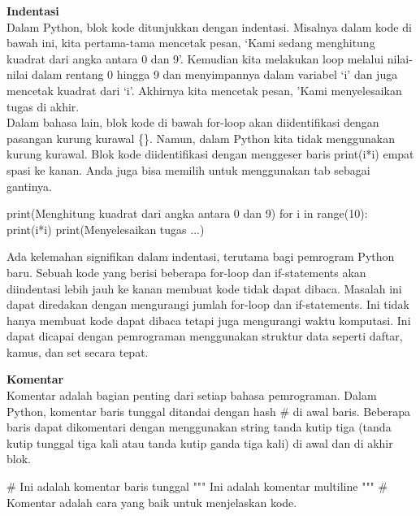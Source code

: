 \documentclass[
  letterpaper,
  DIV=11,
  numbers=noendperiod]{scrreprt}
\newenvironment{Shaded}{\begin{snugshade}}{\end{snugshade}}
\newcommand{\BuiltInTok}[1]{\textcolor[rgb]{0.00,0.23,0.31}{#1}}
\newcommand{\CommentTok}[1]{\textcolor[rgb]{0.37,0.37,0.37}{#1}}
\newcommand{\ControlFlowTok}[1]{\textcolor[rgb]{0.00,0.23,0.31}{#1}}
\newcommand{\DecValTok}[1]{\textcolor[rgb]{0.68,0.00,0.00}{#1}}
\newcommand{\KeywordTok}[1]{\textcolor[rgb]{0.00,0.23,0.31}{#1}}
\newcommand{\NormalTok}[1]{\textcolor[rgb]{0.00,0.23,0.31}{#1}}
\newcommand{\OperatorTok}[1]{\textcolor[rgb]{0.37,0.37,0.37}{#1}}
\newcommand{\StringTok}[1]{\textcolor[rgb]{0.13,0.47,0.30}{#1}}
\begin{document}
\textbf{Indentasi}\\
Dalam Python, blok kode ditunjukkan dengan indentasi. Misalnya dalam
kode di bawah ini, kita pertama-tama mencetak pesan, `Kami sedang
menghitung kuadrat dari angka antara 0 dan 9'. Kemudian kita melakukan
loop melalui nilai-nilai dalam rentang 0 hingga 9 dan menyimpannya dalam
variabel `i' dan juga mencetak kuadrat dari `i'. Akhirnya kita mencetak
pesan, 'Kami menyelesaikan tugas di akhir.\\
Dalam bahasa lain, blok kode di bawah for-loop akan diidentifikasi
dengan pasangan kurung kurawal \{\}. Namun, dalam Python kita tidak
menggunakan kurung kurawal. Blok kode diidentifikasi dengan menggeser
baris print(i*i) empat spasi ke kanan. Anda juga bisa memilih untuk
menggunakan tab sebagai gantinya.

\begin{Shaded}
\begin{Highlighting}[]
\BuiltInTok{print}\NormalTok{(}\StringTok{\textquotesingle{}Menghitung kuadrat dari angka antara 0 dan 9\textquotesingle{}}\NormalTok{) }
\ControlFlowTok{for}\NormalTok{ i }\KeywordTok{in} \BuiltInTok{range}\NormalTok{(}\DecValTok{10}\NormalTok{):}
    \BuiltInTok{print}\NormalTok{(i}\OperatorTok{*}\NormalTok{i)}
\BuiltInTok{print}\NormalTok{(}\StringTok{\textquotesingle{}Menyelesaikan tugas ...\textquotesingle{}}\NormalTok{)}
\end{Highlighting}
\end{Shaded}

Ada kelemahan signifikan dalam indentasi, terutama bagi pemrogram Python
baru. Sebuah kode yang berisi beberapa for-loop dan if-statements akan
diindentasi lebih jauh ke kanan membuat kode tidak dapat dibaca. Masalah
ini dapat diredakan dengan mengurangi jumlah for-loop dan if-statements.
Ini tidak hanya membuat kode dapat dibaca tetapi juga mengurangi waktu
komputasi. Ini dapat dicapai dengan pemrograman menggunakan struktur
data seperti daftar, kamus, dan set secara tepat.

\textbf{Komentar}\\
Komentar adalah bagian penting dari setiap bahasa pemrograman. Dalam
Python, komentar baris tunggal ditandai dengan hash \# di awal baris.
Beberapa baris dapat dikomentari dengan menggunakan string tanda kutip
tiga (tanda kutip tunggal tiga kali atau tanda kutip ganda tiga kali) di
awal dan di akhir blok.

\begin{Shaded}
\begin{Highlighting}[]
\CommentTok{\# Ini adalah komentar baris tunggal}
\CommentTok{"""}
\CommentTok{Ini adalah komentar multiline}
\CommentTok{"""}
\CommentTok{\# Komentar adalah cara yang baik untuk menjelaskan kode.}
\end{Highlighting}
\end{Shaded}
\end{document}
